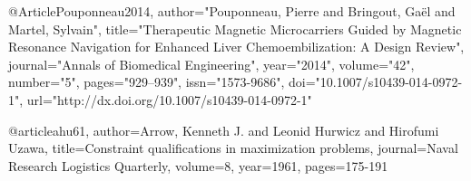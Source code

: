 @Article{Pouponneau2014,
author="Pouponneau, Pierre
and Bringout, Ga{\"e}l
and Martel, Sylvain",
title="Therapeutic Magnetic Microcarriers Guided by Magnetic Resonance Navigation for Enhanced Liver Chemoembilization: A Design Review",
journal="Annals of Biomedical Engineering",
year="2014",
volume="42",
number="5",
pages="929--939",
issn="1573-9686",
doi="10.1007/s10439-014-0972-1",
url="http://dx.doi.org/10.1007/s10439-014-0972-1"
}

@article{ahu61,
   author={Arrow, Kenneth J. and Leonid Hurwicz and Hirofumi Uzawa},
   title={Constraint qualifications in maximization problems},
   journal={Naval Research Logistics Quarterly},
   volume={8},
   year=1961,
   pages={175-191}
}

